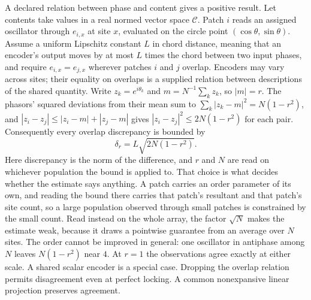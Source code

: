 \documentclass[12pt]{article}
\begin{document}
A declared relation between phase and content gives a positive result. Let contents take values in a real normed vector space $\mathcal{C}$. Patch $i$ reads an assigned oscillator through $e_{i,x}$ at site $x$, evaluated on the circle point $(\cos\theta,\sin\theta)$. Assume a uniform Lipschitz constant $L$ in chord distance, meaning that an encoder's output moves by at most $L$ times the chord between two input phases, and require $e_{i,x}=e_{j,x}$ wherever patches $i$ and $j$ overlap. Encoders may vary across sites; their equality on overlaps is a supplied relation between descriptions of the shared quantity. Write $z_k=e^{i\theta_k}$ and $m=N^{-1}\sum_k z_k$, so $|m|=r$. The phasors' squared deviations from their mean sum to $\sum_k|z_k-m|^2=N(1-r^2)$, and $|z_i-z_j|\leq|z_i-m|+|z_j-m|$ gives $|z_i-z_j|^2\leq2N(1-r^2)$ for each pair. Consequently every overlap discrepancy is bounded by
\begin{equation}
 \delta_r=L\sqrt{2N(1-r^2)}.
 \label{eq:main-content-coherence}
\end{equation}
Here discrepancy is the norm of the difference, and $r$ and $N$ are read on whichever population the bound is applied to. That choice is what decides whether the estimate says anything. A patch carries an order parameter of its own, and reading the bound there carries that patch's resultant and that patch's site count, so a large population observed through small patches is constrained by the small count. Read instead on the whole array, the factor $\sqrt N$ makes the estimate weak, because it draws a pointwise guarantee from an average over $N$ sites. The order cannot be improved in general: one oscillator in antiphase among $N$ leaves $N(1-r^2)$ near $4$. At $r=1$ the observations agree exactly at either scale. A shared scalar encoder is a special case. Dropping the overlap relation permits disagreement even at perfect locking. A common nonexpansive linear projection preserves agreement.
\end{document}
